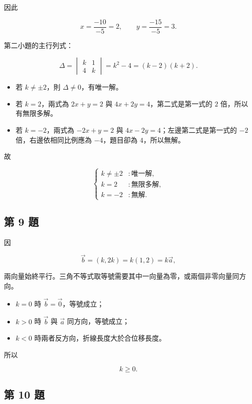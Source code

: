 \documentclass[11pt,a4paper]{article}
\providecommand{\tightlist}{%
  \setlength{\itemsep}{0pt}\setlength{\parskip}{0pt}}
\begin{document}
因此

\[
\boxed{x=\frac{-10}{-5}=2,\qquad
y=\frac{-15}{-5}=3}.
\]

第二小題的主行列式：

\[
\Delta=
\begin{vmatrix}
k&1\\
4&k
\end{vmatrix}
=k^2-4
=(k-2)(k+2).
\]

\begin{itemize}
\tightlist
\item
  若 \(k\ne\pm2\)，則 \(\Delta\ne0\)，有唯一解。
\item
  若 \(k=2\)，兩式為 \(2x+y=2\) 與 \(4x+2y=4\)，第二式是第一式的 \(2\) 倍，所以有無限多解。
\item
  若 \(k=-2\)，兩式為 \(-2x+y=2\) 與 \(4x-2y=4\)；左邊第二式是第一式的 \(-2\) 倍，右邊依相同比例應為 \(-4\)，題目卻為 \(4\)，所以無解。
\end{itemize}

故

\[
\boxed{
\begin{cases}
k\ne\pm2 &: \text{唯一解},\\
k=2 &: \text{無限多解},\\
k=-2 &: \text{無解}.
\end{cases}}
\]

\subsection{第 9 題}\label{ux7b2c-9-ux984c}

因

\[
\vec b=(k,2k)=k(1,2)=k\vec a,
\]

兩向量始終平行。三角不等式取等號需要其中一向量為零，或兩個非零向量同方向。

\begin{itemize}
\tightlist
\item
  \(k=0\) 時 \(\vec b=\vec0\)，等號成立；
\item
  \(k>0\) 時 \(\vec b\) 與 \(\vec a\) 同方向，等號成立；
\item
  \(k<0\) 時兩者反方向，折線長度大於合位移長度。
\end{itemize}

所以

\[
\boxed{k\ge0}.
\]

\subsection{第 10 題}\label{ux7b2c-10-ux984c}
\end{document}
